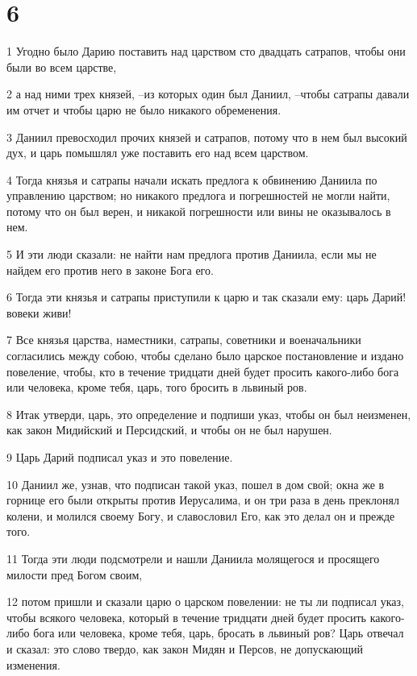 \chapter{6}

\par 1 Угодно было Дарию поставить над царством сто двадцать сатрапов, чтобы они были во всем царстве,
\par 2 а над ними трех князей, --из которых один был Даниил, --чтобы сатрапы давали им отчет и чтобы царю не было никакого обременения.
\par 3 Даниил превосходил прочих князей и сатрапов, потому что в нем был высокий дух, и царь помышлял уже поставить его над всем царством.
\par 4 Тогда князья и сатрапы начали искать предлога к обвинению Даниила по управлению царством; но никакого предлога и погрешностей не могли найти, потому что он был верен, и никакой погрешности или вины не оказывалось в нем.
\par 5 И эти люди сказали: не найти нам предлога против Даниила, если мы не найдем его против него в законе Бога его.
\par 6 Тогда эти князья и сатрапы приступили к царю и так сказали ему: царь Дарий! вовеки живи!
\par 7 Все князья царства, наместники, сатрапы, советники и военачальники согласились между собою, чтобы сделано было царское постановление и издано повеление, чтобы, кто в течение тридцати дней будет просить какого-либо бога или человека, кроме тебя, царь, того бросить в львиный ров.
\par 8 Итак утверди, царь, это определение и подпиши указ, чтобы он был неизменен, как закон Мидийский и Персидский, и чтобы он не был нарушен.
\par 9 Царь Дарий подписал указ и это повеление.
\par 10 Даниил же, узнав, что подписан такой указ, пошел в дом свой; окна же в горнице его были открыты против Иерусалима, и он три раза в день преклонял колени, и молился своему Богу, и славословил Его, как это делал он и прежде того.
\par 11 Тогда эти люди подсмотрели и нашли Даниила молящегося и просящего милости пред Богом своим,
\par 12 потом пришли и сказали царю о царском повелении: не ты ли подписал указ, чтобы всякого человека, который в течение тридцати дней будет просить какого-либо бога или человека, кроме тебя, царь, бросать в львиный ров? Царь отвечал и сказал: это слово твердо, как закон Мидян и Персов, не допускающий изменения.
